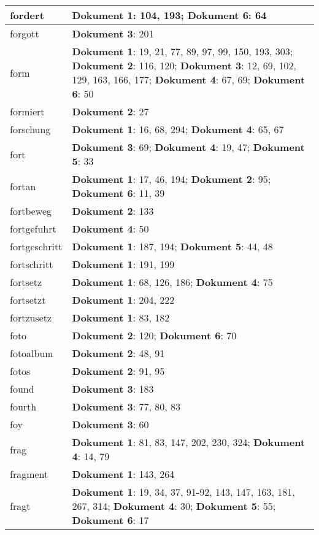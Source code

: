 \documentclass[a5paper]{article}
\begin{document}
\begin{longtable}[l]{|l|p{3in}|}
\hline
fordert & \textbf{Dokument 1}: 104, 193; \textbf{Dokument 6}: 64 \\
\hline
forgott & \textbf{Dokument 3}: 201 \\
\hline
form & \textbf{Dokument 1}: 19, 21, 77, 89, 97, 99, 150, 193, 303; \textbf{Dokument 2}: 116, 120; \textbf{Dokument 3}: 12, 69, 102, 129, 163, 166, 177; \textbf{Dokument 4}: 67, 69; \textbf{Dokument 6}: 50 \\
\hline
formiert & \textbf{Dokument 2}: 27 \\
\hline
forschung & \textbf{Dokument 1}: 16, 68, 294; \textbf{Dokument 4}: 65, 67 \\
\hline
fort & \textbf{Dokument 3}: 69; \textbf{Dokument 4}: 19, 47; \textbf{Dokument 5}: 33 \\
\hline
fortan & \textbf{Dokument 1}: 17, 46, 194; \textbf{Dokument 2}: 95; \textbf{Dokument 6}: 11, 39 \\
\hline
fortbeweg & \textbf{Dokument 2}: 133 \\
\hline
fortgefuhrt & \textbf{Dokument 4}: 50 \\
\hline
fortgeschritt & \textbf{Dokument 1}: 187, 194; \textbf{Dokument 5}: 44, 48 \\
\hline
fortschritt & \textbf{Dokument 1}: 191, 199 \\
\hline
fortsetz & \textbf{Dokument 1}: 68, 126, 186; \textbf{Dokument 4}: 75 \\
\hline
fortsetzt & \textbf{Dokument 1}: 204, 222 \\
\hline
fortzusetz & \textbf{Dokument 1}: 83, 182 \\
\hline
foto & \textbf{Dokument 2}: 120; \textbf{Dokument 6}: 70 \\
\hline
fotoalbum & \textbf{Dokument 2}: 48, 91 \\
\hline
fotos & \textbf{Dokument 2}: 91, 95 \\
\hline
found & \textbf{Dokument 3}: 183 \\
\hline
fourth & \textbf{Dokument 3}: 77, 80, 83 \\
\hline
foy & \textbf{Dokument 3}: 60 \\
\hline
frag & \textbf{Dokument 1}: 81, 83, 147, 202, 230, 324; \textbf{Dokument 4}: 14, 79 \\
\hline
fragment & \textbf{Dokument 1}: 143, 264 \\
\hline
fragt & \textbf{Dokument 1}: 19, 34, 37, 91-92, 143, 147, 163, 181, 267, 314; \textbf{Dokument 4}: 30; \textbf{Dokument 5}: 55; \textbf{Dokument 6}: 17 \\

\end{longtable}
\end{document}
